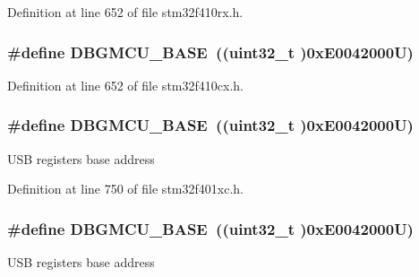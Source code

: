 Definition at line 652 of file stm32f410rx.\+h.

\subsubsection[{\texorpdfstring{D\+B\+G\+M\+C\+U\+\_\+\+B\+A\+SE}{DBGMCU_BASE}}]{\setlength{\rightskip}{0pt plus 5cm}\#define D\+B\+G\+M\+C\+U\+\_\+\+B\+A\+SE~((uint32\+\_\+t )0x\+E0042000\+U)}\hypertarget{group___peripheral__registers__structures_ga4adaf4fd82ccc3a538f1f27a70cdbbef}{}\label{group___peripheral__registers__structures_ga4adaf4fd82ccc3a538f1f27a70cdbbef}


Definition at line 652 of file stm32f410cx.\+h.

\subsubsection[{\texorpdfstring{D\+B\+G\+M\+C\+U\+\_\+\+B\+A\+SE}{DBGMCU_BASE}}]{\setlength{\rightskip}{0pt plus 5cm}\#define D\+B\+G\+M\+C\+U\+\_\+\+B\+A\+SE~((uint32\+\_\+t )0x\+E0042000\+U)}\hypertarget{group___peripheral__registers__structures_ga4adaf4fd82ccc3a538f1f27a70cdbbef}{}\label{group___peripheral__registers__structures_ga4adaf4fd82ccc3a538f1f27a70cdbbef}
U\+SB registers base address 

Definition at line 750 of file stm32f401xc.\+h.

\subsubsection[{\texorpdfstring{D\+B\+G\+M\+C\+U\+\_\+\+B\+A\+SE}{DBGMCU_BASE}}]{\setlength{\rightskip}{0pt plus 5cm}\#define D\+B\+G\+M\+C\+U\+\_\+\+B\+A\+SE~((uint32\+\_\+t )0x\+E0042000\+U)}\hypertarget{group___peripheral__registers__structures_ga4adaf4fd82ccc3a538f1f27a70cdbbef}{}\label{group___peripheral__registers__structures_ga4adaf4fd82ccc3a538f1f27a70cdbbef}
U\+SB registers base address 

